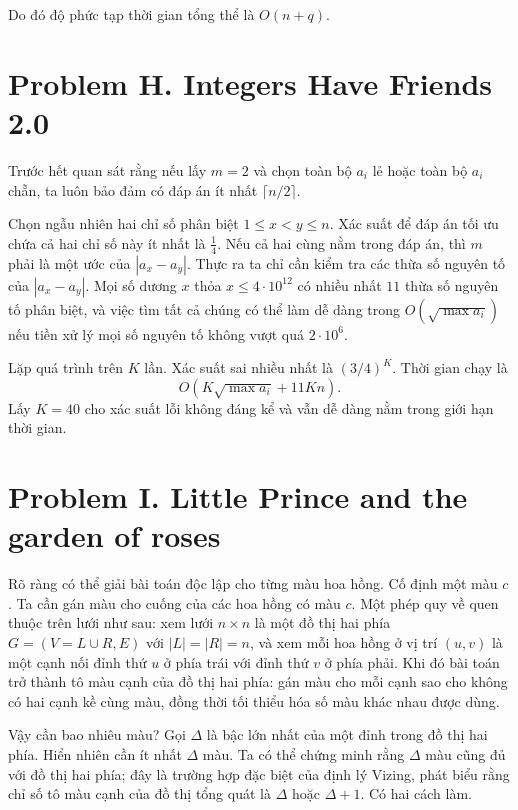 \documentclass[11pt]{article}
\begin{document}
Do đó độ phức tạp thời gian tổng thể là $O(n+q)$.

\section{Problem H. Integers Have Friends 2.0}

Trước hết quan sát rằng nếu lấy $m=2$ và chọn toàn bộ $a_i$ lẻ hoặc toàn bộ
$a_i$ chẵn, ta luôn bảo đảm có đáp án ít nhất $\lceil n/2\rceil$.

Chọn ngẫu nhiên hai chỉ số phân biệt $1\le x<y\le n$. Xác suất để đáp án tối
ưu chứa cả hai chỉ số này ít nhất là $\frac14$. Nếu cả hai cùng nằm trong đáp
án, thì $m$ phải là một ước của $|a_x-a_y|$. Thực ra ta chỉ cần kiểm tra các
thừa số nguyên tố của $|a_x-a_y|$. Mọi số dương $x$ thỏa
$x\le 4\cdot 10^{12}$ có nhiều nhất $11$ thừa số nguyên tố phân biệt, và việc
tìm tất cả chúng có thể làm dễ dàng trong $O(\sqrt{\max a_i})$ nếu tiền xử
lý mọi số nguyên tố không vượt quá $2\cdot 10^6$.

Lặp quá trình trên $K$ lần. Xác suất sai nhiều nhất là $(3/4)^K$. Thời gian
chạy là
\[
  O(K\sqrt{\max a_i}+11Kn).
\]
Lấy $K=40$ cho xác suất lỗi không đáng kể và vẫn dễ dàng nằm trong giới hạn
thời gian.

\section{Problem I. Little Prince and the garden of roses}

Rõ ràng có thể giải bài toán độc lập cho từng màu hoa hồng. Cố định một màu
$c$. Ta cần gán màu cho cuống của các hoa hồng có màu $c$. Một phép quy về
quen thuộc trên lưới như sau: xem lưới $n\times n$ là một đồ thị hai phía
$G=(V=L\cup R,E)$ với $|L|=|R|=n$, và xem mỗi hoa hồng ở vị trí $(u,v)$ là
một cạnh nối đỉnh thứ $u$ ở phía trái với đỉnh thứ $v$ ở phía phải. Khi đó
bài toán trở thành tô màu cạnh của đồ thị hai phía: gán màu cho mỗi cạnh sao
cho không có hai cạnh kề cùng màu, đồng thời tối thiểu hóa số màu khác nhau
được dùng.

Vậy cần bao nhiêu màu? Gọi $\Delta$ là bậc lớn nhất của một đỉnh trong đồ thị
hai phía. Hiển nhiên cần ít nhất $\Delta$ màu. Ta có thể chứng minh rằng
$\Delta$ màu cũng đủ với đồ thị hai phía; đây là trường hợp đặc biệt của định
lý Vizing, phát biểu rằng chỉ số tô màu cạnh của đồ thị tổng quát là
$\Delta$ hoặc $\Delta+1$. Có hai cách làm.
\end{document}
